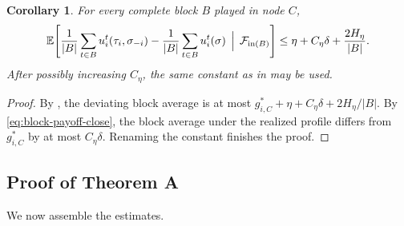 \documentclass[12pt]{article}
\newtheorem{corollary}[theorem]{Corollary}
\theoremstyle{definition}
\newcommand{\E}{\mathbb{E}}
\newcommand{\1}{\mathbf{1}}
\begin{document}
\begin{corollary}
\label{cor:block-regret}
For every complete block \(B\) played in node \(C\),
\[
\E\!\left[
\frac1{|B|}\sum_{t\in B} u_i^t(\tau_i,\sigma_{-i})
-
\frac1{|B|}\sum_{t\in B} u_i^t(\sigma)
\,\Bigm|\, \mathcal F_{\mathrm{in}(B)}
\right]
\le
\eta + C_\eta\delta + \frac{2H_\eta}{|B|}.
\]
After possibly increasing \(C_\eta\), the same constant as in 
may be used.
\end{corollary}

\begin{proof}
By , the deviating block average is at most
\(g_{i,C}^*+\eta+C_\eta\delta+2H_\eta/|B|\).  By \eqref{eq:block-payoff-close}, the block
average under the realized profile differs from \(g_{i,C}^*\) by at most \(C_\eta\delta\).
Renaming the constant finishes the proof.
\end{proof}

\subsection{Proof of Theorem A}

We now assemble the estimates.
\end{document}
